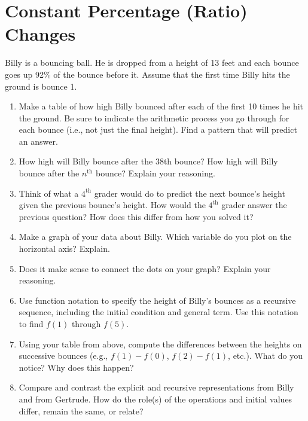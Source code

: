 \newpage
\section{Constant Percentage (Ratio) Changes}\label{A:ConstantRatio}

\begin{prob}
Billy is a bouncing ball.  He is dropped from a height of 13 feet and each bounce goes up 92\% of the bounce before it.  Assume that the first time Billy hits the ground is bounce 1.  

\begin{enumerate}
\item Make a table of how high Billy bounced after each of the first 10 times he hit the ground.  Be sure to indicate the arithmetic process you go through for each bounce (i.e., not just the final height).  Find a pattern that will predict an answer.  

\item How high will Billy bounce after the 38th bounce?  How high will Billy bounce after the $n^\mathrm{th}$ bounce?  Explain your reasoning. 

\item Think of what a $4^\mathrm{th}$ grader would do to predict the next bounce's height given the previous bounce's height.  How would the $4^\mathrm{th}$ grader answer the previous question?  How does this differ from how you solved it?

\item Make a graph of your data about Billy.  Which variable do you plot on the horizontal axis?  Explain.  
\item Does it make sense to connect the dots on your graph?  Explain your reasoning.  

\item  Use function notation to specify the height of Billy's bounces as a recursive sequence, including the initial condition and general term.   Use this notation to find $f(1)$ through $f(5)$.

\item Using your table from above, compute the differences between the heights on successive bounces (e.g.,  $f(1) - f(0)$, $f(2) - f(1)$, etc.).  What do you notice?  Why does this happen?

\item Compare and contrast the explicit and recursive representations from Billy and from Gertrude.  How do the role(s) of the operations and initial values differ, remain the same, or relate?
\end{enumerate}
\end{prob}

